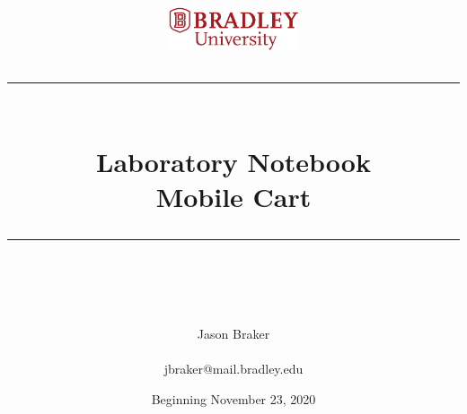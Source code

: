 \documentclass[fontsize=11pt, %
                             paper=letter, %
                             openany, %
                             captions=tableheading,
                             index=totoc,
                             hyperref]{labbook}
\newcommand{\HRule}{\rule{\linewidth}{0.5mm}} %
\begin{document}


%

\title{
\begin{center}
\href{http://www.bradley.edu}{\includegraphics[height=0.5in]{figs/logoBU1-Print}}
\vskip10pt
\HRule \\[0.4cm]
{\Huge \bfseries Laboratory Notebook \\[0.5cm] \Large Mobile Cart}\\[0.4cm] %
\HRule \\[1.5cm]
\end{center}
}
\author{Jason Braker \\ \\\Large jbraker@mail.bradley.edu} %
\date{Beginning November 23, 2020} %
\maketitle


\printindex
\tableofcontents %
\newpage %
\end{document}
